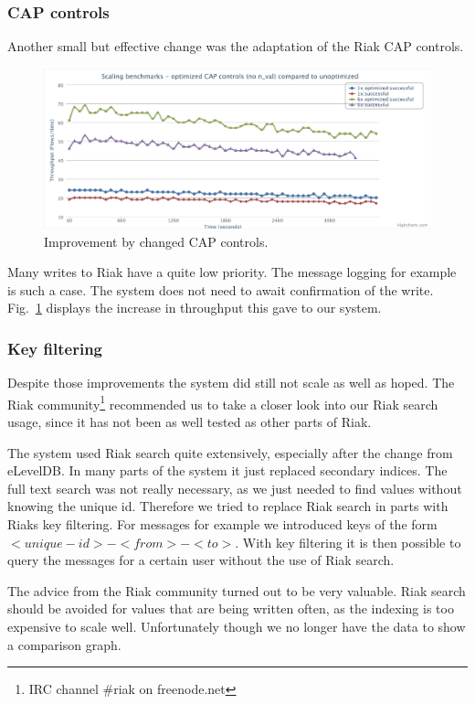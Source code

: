 \documentclass[11pt,a4paper]{report}
\begin{document}
\subsubsection{CAP controls}
Another small but effective change was the adaptation of the Riak CAP controls.
\begin{figure}[htbp!]
 \hspace{-2.5cm}
 \includegraphics[width=18cm]{./graphics/Load_test-cap.pdf}
 \caption{Improvement by changed CAP controls.}
 \label{fig:load_test:cap}
\end{figure}
Many writes to Riak have a quite low priority.
The message logging for example is such a case.
The system does not need to await confirmation of the write.
Fig.~\ref{fig:load_test:cap} displays the increase in throughput this gave to our system.


\subsubsection{Key filtering}
\label{sec:load_tests:key_filtering}
Despite those improvements the system did still not scale as well as hoped.
The Riak community\footnote{IRC channel \#riak on freenode.net} recommended
us to take a closer look into our Riak search usage,
since it has not been as well tested as other parts of Riak.

The system used Riak search quite extensively, especially after the change from eLevelDB.
In many parts of the system it just replaced secondary indices.
The full text search was not really necessary, as we just needed to find values
without knowing the unique id.
Therefore we tried to replace Riak search in parts with Riaks key filtering.
For messages for example we introduced keys of the form $<unique-id>-<from>-<to>$.
With key filtering it is then possible to query the messages for a certain user without
the use of Riak search.

The advice from the Riak community turned out to be very valuable.
Riak search should be avoided for values that are being written often,
as the indexing is too expensive to scale well.
Unfortunately though we no longer have the data to show a comparison graph.
\end{document}
